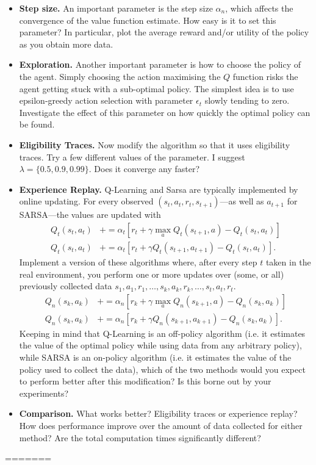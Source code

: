 \documentclass[twoside,a4paper]{article}
\begin{document}
\begin{itemize}
\item \textbf{Step size.} An important parameter is the step size  $\alpha_n$, which affects the convergence of the value function estimate. How easy is it to set this parameter? In particular, plot the average reward and/or utility of the policy as you obtain more data.
\item \textbf{Exploration.} Another important parameter is how to choose the policy of the agent. Simply choosing the action maximising the $Q$ function risks the agent getting stuck with a sub-optimal policy. The simplest idea is to use epsilon-greedy action selection  with parameter $\epsilon_t$ slowly tending to zero. Investigate the effect of this parameter on how quickly the optimal policy can be found.
\item \textbf{Eligibility Traces.}  Now modify the algorithm so that it uses eligibility traces. Try a few different values of the parameter. I suggest $\lambda = \{0.5, 0.9, 0.99\}$. Does it converge any faster?
  
\item \textbf{Experience Replay.} Q-Learning and Sarsa are typically implemented by online updating. For every observed $(s_t,a_t, r_t, s_{t+1})$---as well as $a_{t+1}$ for SARSA---the values are updated with
  \begin{align}
    Q_t(s_t, a_t) &+=  \alpha_t [r_t + \gamma \max_a Q_t(s_{t+1}, a) -  Q_t(s_t, a_t)] \tag{Q-Learning}\\
    Q_t(s_t, a_t) &+=  \alpha_t [r_t + \gamma Q_t(s_{t+1}, a_{t+1}) -  Q_t(s_t, a_t)] \tag{SARSA}.
  \end{align}
  Implement a version of these algorithms where, after every step $t$ taken in the real environment, you perform one or more updates over (some, or all) previously collected data $s_1, a_1, r_1, \ldots, s_k, a_k, r_k, \ldots, s_t, a_t, r_t$.
  \begin{align}
    Q_n(s_k, a_k) &+=  \alpha_n [r_k + \gamma \max_a Q_n(s_{k+1}, a) -  Q_n(s_k, a_k)] \tag{Q-Learning}\\
    Q_n(s_k, a_k) &+=  \alpha_n [r_k + \gamma Q_n(s_{k+1}, a_{k+1}) -  Q_n(s_k, a_k)] \tag{SARSA}.
  \end{align}
  Keeping in mind that Q-Learning is an off-policy algorithm (i.e. it estimates the value of the optimal policy while using data from any arbitrary policy), while SARSA is an on-policy algorithm (i.e. it estimates the value of the policy used to collect the data), which of the two methods would you expect to perform better after this modification? Is this borne out by your experiments?

\item \textbf{Comparison.} What works better? Eligibility traces or experience replay? How does performance improve over the amount of data collected for either method? Are the total computation times significantly different?
\end{itemize}
=======
\vspace{1em}
\end{document}
